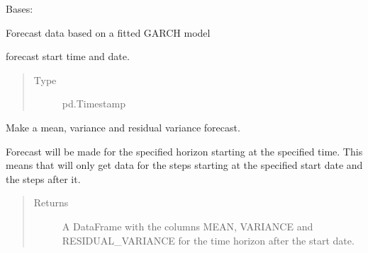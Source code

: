 \documentclass[letterpaper,10pt,english]{sphinxmanual}
\begin{document}

\begin{fulllineitems}
\label{\detokenize{dalio.pipe:dalio.pipe.forecast.GARCHForecast}}
Bases: {\hyperref[\detokenize{dalio.pipe:dalio.pipe.forecast.Forecast}]{}}

Forecast data based on a fitted GARCH model

\begin{fulllineitems}
\label{\detokenize{dalio.pipe:dalio.pipe.forecast.GARCHForecast._start}}
forecast start time and date.
\begin{quote}\begin{description}
\item[{Type}] \leavevmode
pd.Timestamp

\end{description}\end{quote}

\end{fulllineitems}


\begin{fulllineitems}
\label{\detokenize{dalio.pipe:dalio.pipe.forecast.GARCHForecast.transform}}
Make a mean, variance and residual variance forecast.

Forecast will be made for the specified horizon starting at the
specified time. This means that will only get data for the steps
starting at the specified start date and the steps after it.
\begin{quote}\begin{description}
\item[{Returns}] \leavevmode
A DataFrame with the columns MEAN, VARIANCE and RESIDUAL\_VARIANCE
for the time horizon after the start date.

\end{description}\end{quote}

\end{fulllineitems}


\end{fulllineitems}
\end{document}
